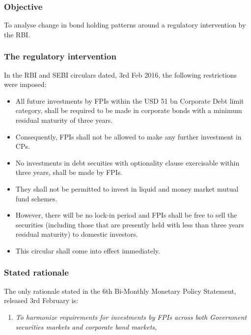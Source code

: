 \documentclass[9pt]{beamer}
\begin{document}
\newcommand{\hi}[1]{\textcolor{red}{#1}}

\newcommand{\fullpage}[1]{
  \part{#1}
  \begin{frame}
    \partpage
  \end{frame}
}


\addtocounter{framenumber}{-1}
{
  \begin{frame}
    \titlepage
  \end{frame}
}
 

\begin{frame} \frametitle{Objective} 
  To analyse change in bond holding
  patterns around a regulatory intervention by the RBI.
\end{frame}


\begin{frame}
  \frametitle{The regulatory intervention} 
  In the RBI and SEBI circulars dated, 3rd Feb 2016, the following restrictions were
  imposed:
  \begin{itemize}
  \item All future investments by FPIs within the USD 51 bn Corporate
    Debt limit category, shall be required to be made in corporate bonds
    with a minimum residual maturity of three years.
  \item Consequently, FPIs shall not be allowed to make any
    further investment in CPs.
  \item No investments in debt secuities with optionality clause
    exercisable within three years, shall be made by FPIs.
  \item They shall not be permitted to invest in liquid and money
    market mutual fund schemes.
  \item However, there will be no lock-in period and FPIs shall be free to sell
    the securities (including those that are presently held with less than
    three years residual maturity) to domestic investors.
  \item This circular shall come into effect immediately.
  \end{itemize}  
\end{frame}


\begin{frame}
  \frametitle{Stated rationale}
  The only rationale stated in the 6th Bi-Monthly Monetary Policy
  Statement, released 3rd February is:\\
  \begin{enumerate}
  \item \textit{To harmonize requirements for investments by FPIs across
      both Government securities markets and corporate bond markets,}
  \end{enumerate}
\end{frame}
\end{document}
